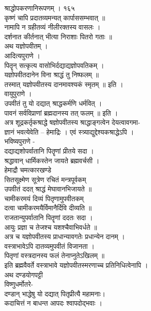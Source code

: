 \documentclass[11pt, openany]{book}
\begin{document}
{{{{{{{{{{{{{{{{{{{{{{{{{{{{{{{{{{{{{{{{{{{{{{{{{{{{{{{{{{{{{{{{{{{{{{{{{{{{ श्राद्धोपकरणानिरूपणम् । १६५\\
कृष्णं चापि प्रदातव्यमन्यत् कार्पाससम्भवात् ॥\\
नामापि न ग्रहीतव्यं नीलीरक्तस्य वासलः ।\\
दर्शनात कीर्तनात् भीत्या निराशाः पितरो गताः ॥\\
अथ यज्ञोपवीतम् ।\\
आदित्यपुराणे ।\\
पितॄन् सत्कृत्य वासोभिर्दद्याद्यज्ञोपवतिकम् ।\\
यज्ञोपवीतदानेन विना श्राद्धं तु निष्फलम् ॥\\
तस्मात् यज्ञोपवीतस्य दानमावश्यकं स्मृतम् ॥ इति ।\\
वायुपुराणे ।\\
उपवीतं तु यो दद्यात् श्राद्धकर्मणि धर्मवित् ।\\
पावनं सर्वविप्राणां ब्रह्मदानस्य तत् फलम् ॥ इति ।\\
अत्र शूद्रकर्तृकश्राद्धे षज्ञोपवीतस्य श्राद्धाङ्गत्वेन देयत्वावगमा-\\
ज्ञानं भवत्येवेति -- हेमाद्रिः । एवं स्त्र्याद्युद्देश्यकश्राद्धेऽपि ।\\
भविष्यपुराणे -\\
दद्याद्यशोपर्वातानि पितॄणां प्रीतये सदा ।\\
श्रद्धावान् धार्मिकस्तेन जायते ब्रह्मवर्चसी ।\\
हेमाद्रौ चमत्कारखण्डे \textbar{}\\
सितसूक्ष्मेण सूत्रेण रचितं मन्त्रपूर्वकम् \textbar{}\\
उपवीतं ददत् श्राद्धं मेघावानभिजायते ॥\\
चामीकरमयं दिव्यं पितृणामुपवीतकम् \textbar{}\\
दत्वा चामीकरमयैर्विमानैर्दिवि दीव्यति ॥\\
राजतान्युपर्वातानि पितॄणां ददतः सदा ।\\
आयुः प्रज्ञा च तेजश्च यशश्चैवाभिवर्धते ॥\\
अत्र च यज्ञोपवीतस्य प्राधान्यावगतेः प्रधान्येन दानम् ।\\
वस्त्राभावेऽपि दातव्यमुपवीतं विजानता ।\\
पितृणां वस्त्रदानस्य फलं तेनाप्नुतेऽखिलम् ॥\\
इति ब्रह्मवैवर्ते वस्त्राभावे यज्ञोपवीतस्मरणाच्च प्रतिनिधित्वेनापि ।\\
अथ दण्डयोगपट्टी \textbar{}\\
विष्णुधर्मोतरे-\\
दण्डान् भाद्धेषु यो दद्यात् पितृप्रीत्यै महामनाः।\\
कदाचित्तं न बाधन्त आपदः श्वापदोद्भवाः ।\\


}}}}}}}}}}}}}}}}}}}}}}}}}}}}}}}}}}}}}}}}}}}}}}}}}}}}}}}}}}}}}}}}}}}}}}}}}}}}
\end{document}
